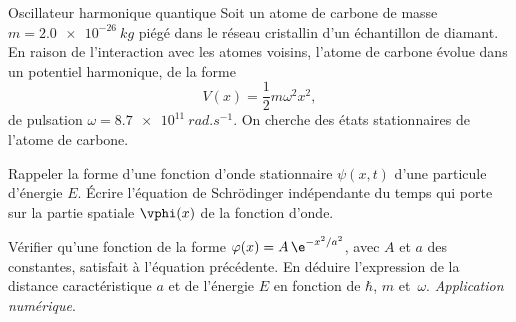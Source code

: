 \begin{exo}[PC][2][TD]{Oscillateur harmonique quantique}
Soit un atome de carbone de masse $m=\SI{2.0e-26}{kg}$ piégé dans le réseau cristallin d’un échantillon de diamant. En raison de l’interaction avec les atomes voisins, l'atome de carbone évolue dans un potentiel harmonique, de la forme
\begin{equation}
  V(x) = \textstyle\frac{1}{2}m\omega^2 x^2,
\end{equation}
de pulsation $\omega = \SI{8.7e11}{rad.s^{-1}}$. On cherche des états stationnaires de l'atome de carbone.
\begin{quest}
\item Rappeler la forme d'une fonction d'onde stationnaire  $\psi(x,t)$ d'une particule d'énergie $E$. Écrire l'équation de Schrödinger indépendante du temps qui porte sur la partie spatiale $\vphi(x)$ de la fonction d'onde.
\item Vérifier qu'une fonction de la forme $\varphi(x)=A \,\e^{-x^2/a^2}$, avec $A$ et $a$ des constantes, satisfait à l'équation précédente. En déduire l'expression de la distance caractéristique $a$ et de l'énergie $E$ en fonction de $\hbar$, $m$ et~$\omega$. \emph{Application numérique}.


\end{quest}
\end{exo}
